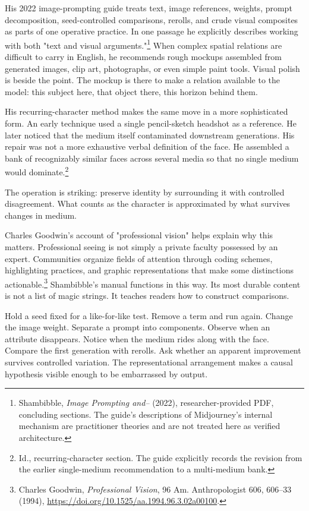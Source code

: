 \documentclass[11pt]{article}
\begin{document}
His 2022 image-prompting guide treats text, image references, weights, prompt decomposition, seed-controlled comparisons, rerolls, and crude visual composites as parts of one operative practice. In one passage he explicitly describes working with both "text and visual arguments."\footnote{Shambibble, \textit{Image Prompting and--} (2022), researcher-provided PDF, concluding sections. The guide's descriptions of Midjourney's internal mechanism are practitioner theories and are not treated here as verified architecture.} When complex spatial relations are difficult to carry in English, he recommends rough mockups assembled from generated images, clip art, photographs, or even simple paint tools. Visual polish is beside the point. The mockup is there to make a relation available to the model: this subject here, that object there, this horizon behind them.

His recurring-character method makes the same move in a more sophisticated form. An early technique used a single pencil-sketch headshot as a reference. He later noticed that the medium itself contaminated downstream generations. His repair was not a more exhaustive verbal definition of the face. He assembled a bank of recognizably similar faces across several media so that no single medium would dominate.\footnote{Id., recurring-character section. The guide explicitly records the revision from the earlier single-medium recommendation to a multi-medium bank.}

The operation is striking: preserve identity by surrounding it with controlled disagreement. What counts as the character is approximated by what survives changes in medium.

Charles Goodwin's account of "professional vision" helps explain why this matters. Professional seeing is not simply a private faculty possessed by an expert. Communities organize fields of attention through coding schemes, highlighting practices, and graphic representations that make some distinctions actionable.\footnote{Charles Goodwin, \textit{Professional Vision}, 96 Am. Anthropologist 606, 606--33 (1994), \url{https://doi.org/10.1525/aa.1994.96.3.02a00100}.} Shambibble's manual functions in this way. Its most durable content is not a list of magic strings. It teaches readers how to construct comparisons.

Hold a seed fixed for a like-for-like test. Remove a term and run again. Change the image weight. Separate a prompt into components. Observe when an attribute disappears. Notice when the medium rides along with the face. Compare the first generation with rerolls. Ask whether an apparent improvement survives controlled variation. The representational arrangement makes a causal hypothesis visible enough to be embarrassed by output.
\end{document}
